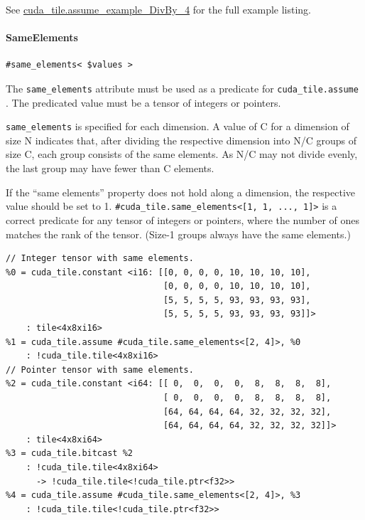 \documentclass{article}
\begin{document}
See \href{https://docs.nvidia.com/cuda/tile-ir/latest/sections/appendix.html#example-cuda-tile-assume-example-divby-4}{cuda\_tile.assume\_example\_DivBy\_4} for the full example listing.



\paragraph{SameElements}

\begin{lstlisting}
#same_elements< $values >
\end{lstlisting}

The \texttt{same\_elements} attribute must be used as a predicate for \texttt{cuda\_tile.assume} . The predicated value must be a tensor of integers or pointers.


\texttt{same\_elements} is specified for each dimension. A value of C for a dimension of size N indicates that, after dividing the respective dimension into N/C groups of size C, each group consists of the same elements. As N/C may not divide evenly, the last group may have fewer than C elements.


If the ``same elements'' property does not hold along a dimension, the respective value should be set to 1. \texttt{\#cuda\_tile.same\_elements<[1, 1, ..., 1]>} is a correct predicate for any tensor of integers or pointers, where the number of ones matches the rank of the tensor. (Size-1 groups always have the same elements.)


\begin{lstlisting}
// Integer tensor with same elements.
%0 = cuda_tile.constant <i16: [[0, 0, 0, 0, 10, 10, 10, 10],
                               [0, 0, 0, 0, 10, 10, 10, 10],
                               [5, 5, 5, 5, 93, 93, 93, 93],
                               [5, 5, 5, 5, 93, 93, 93, 93]]>
    : tile<4x8xi16>
%1 = cuda_tile.assume #cuda_tile.same_elements<[2, 4]>, %0
    : !cuda_tile.tile<4x8xi16>
// Pointer tensor with same elements.
%2 = cuda_tile.constant <i64: [[ 0,  0,  0,  0,  8,  8,  8,  8],
                               [ 0,  0,  0,  0,  8,  8,  8,  8],
                               [64, 64, 64, 64, 32, 32, 32, 32],
                               [64, 64, 64, 64, 32, 32, 32, 32]]>
    : tile<4x8xi64>
%3 = cuda_tile.bitcast %2
    : !cuda_tile.tile<4x8xi64>
      -> !cuda_tile.tile<!cuda_tile.ptr<f32>>
%4 = cuda_tile.assume #cuda_tile.same_elements<[2, 4]>, %3
    : !cuda_tile.tile<!cuda_tile.ptr<f32>>
\end{lstlisting}
\end{document}
